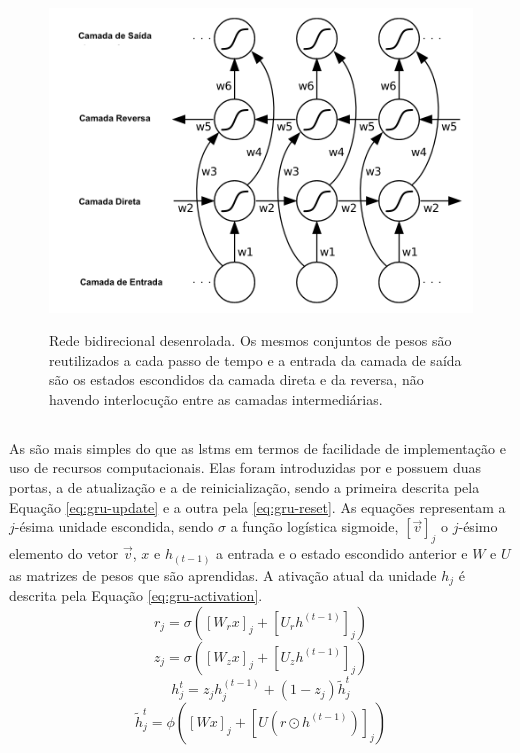 \begin{figure}[htbp]
    \centering
        \caption[Rede  bidirecional desenrolada.]{Rede  bidirecional desenrolada. Os mesmos conjuntos de pesos são reutilizados a cada passo de tempo e a entrada da camada de saída são os estados escondidos da camada direta e da reversa, não havendo interlocução entre as camadas intermediárias.}
        \includegraphics[scale=0.8]{resources/images/pln/rnn-bidirecionalidade.png}
        \label{fig:rnn-bidirecionalidade}
\end{figure}

\subsection{}
\label{sec:gru}

As  são mais simples do que as \glspl{lstm} em termos de facilidade de implementação e uso de recursos computacionais. Elas foram introduzidas por \textcite{Cho2014Learning} e possuem duas portas, a de atualização e a de reinicialização, sendo a primeira descrita pela Equação \ref{eq:gru-update} e a outra pela \ref{eq:gru-reset}. As equações representam a $j$-ésima unidade escondida, sendo $\sigma$ a função logística sigmoide, $[\vec v]_j$ o $j$-ésimo elemento do vetor $\vec v$, $x$ e $h_{(t-1)}$ a entrada e o estado escondido anterior e $W$ e $U$ as matrizes de pesos que são aprendidas. A ativação atual da unidade $h_j$ é descrita pela Equação \ref{eq:gru-activation}.
\begin{equation}
    \label{eq:gru-update}
    r_j = \sigma([W_r x]_j + [U_r h^{(t-1)}]_j)
\end{equation}
\begin{equation}
    \label{eq:gru-reset}
    z_j = \sigma([W_z x]_j + [U_z h^{(t-1)}]_j)
\end{equation}
\begin{equation}
    \label{eq:gru-activation}
    h_j^t = z_j h_j^{(t-1)} + (1 - z_j) \tilde{h}_j^t
\end{equation}
\begin{equation}
    \label{eq:gru-activation-tild}
    \tilde{h}_j^t = \phi([Wx]_j + [U(r \odot h^{(t-1)})]_j)
\end{equation}

